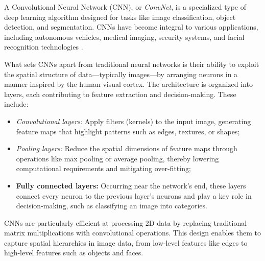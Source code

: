 A Convolutional Neural Network (CNN), or \textit{ConvNet}, is a specialized type of deep learning algorithm designed for tasks like image classification, object detection, and segmentation. CNNs have become integral to various applications, including autonomous vehicles, medical imaging, security systems, and facial recognition technologies \cite{DBLP:journals/corr/OSheaN15}. 

What sets CNNs apart from traditional neural networks is their ability to exploit the spatial structure of data—typically images—by arranging neurons in a manner inspired by the human visual cortex. The architecture is organized into layers, each contributing to feature extraction and decision-making. These include:

\begin{itemize}
    \item \textit{Convolutional layers:} Apply filters (kernels) to the input image, generating feature maps that highlight patterns such as edges, textures, or shapes;
    \item \textit{Pooling layers:} Reduce the spatial dimensions of feature maps through operations like max pooling or average pooling, thereby lowering computational requirements and mitigating over-fitting;
    \item \textbf{Fully connected layers:} Occurring near the network's end, these layers connect every neuron to the previous layer's neurons and play a key role in decision-making, such as classifying an image into categories.
\end{itemize}

CNNs are particularly efficient at processing 2D data by replacing traditional matrix multiplications with convolutional operations. This design enables them to capture spatial hierarchies in image data, from low-level features like edges to high-level features such as objects and faces.

